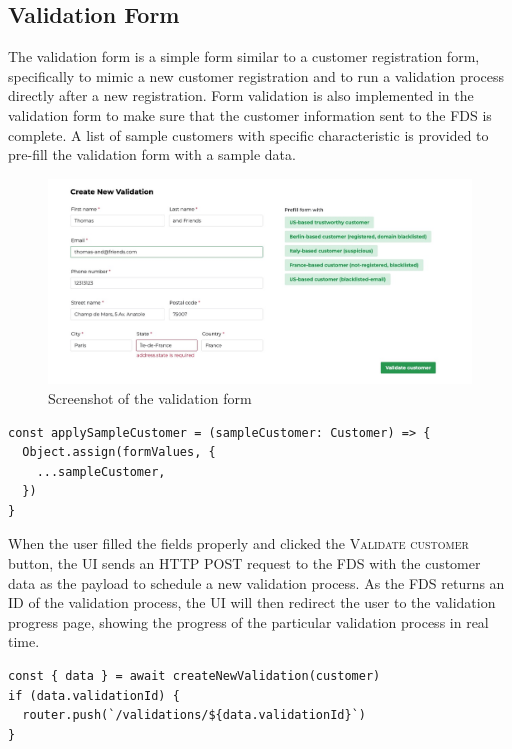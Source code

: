   \subsection{Validation Form}

    The validation form is a simple form similar to a customer registration form, specifically to mimic a new customer registration and to run a validation process directly after a new registration. Form validation is also implemented in the validation form to make sure that the customer information sent to the FDS is complete. A list of sample customers with specific characteristic is provided to pre-fill the validation form with a sample data. 

    \begin{figure}[!ht]
      \includegraphics[width=\textwidth]{images/ss_customer_form.jpeg}
      \caption{Screenshot of the validation form}
    \end{figure}

    \begin{lstlisting}[style=es6, caption={Prefilling form values with a sample customer data (TypeScript)}]
const applySampleCustomer = (sampleCustomer: Customer) => {
  Object.assign(formValues, {
    ...sampleCustomer,
  })
}
    \end{lstlisting}

    When the user filled the fields properly and clicked the \textsc{Validate customer} button, the UI sends an HTTP POST request to the FDS with the customer data as the payload to schedule a new validation process. As the FDS returns an ID of the validation process, the UI will then redirect the user to the validation progress page, showing the progress of the particular validation process in real time. 

    \begin{lstlisting}[style=es6, caption={Redirecting to the progress page when a validation process is scheduled successfully (TypeScript)}]
const { data } = await createNewValidation(customer)
if (data.validationId) {
  router.push(`/validations/${data.validationId}`)
}
    \end{lstlisting}

